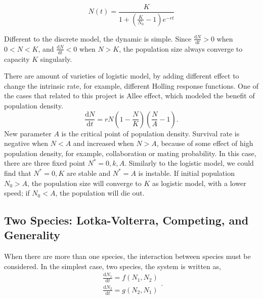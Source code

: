     \begin{equation*}
        N(t) = \frac{K}{1 + (\frac{K}{N_0}-1) e^{-rt}}
    \end{equation*}
    
    Different to the discrete model, the dynamic is simple. Since $\frac{\mathrm{d} N}{\mathrm{d}t}>0$ when $0<N<K$, and $\frac{\mathrm{d} N}{\mathrm{d}t}<0$ when $N>K$, the population size always converge to capacity $K$ singularly.

    There are amount of varieties of logistic model, by adding different effect to change the intrinsic rate, for example, different Holling response functions. One of the cases that related to this project is Allee effect, which modeled the benefit of population density.
    \begin{equation}
        \frac{\mathrm{d} N}{\mathrm{d}t} = r N (1-\frac{N}{K}) (\frac{N}{A} - 1).
    \end{equation}
    New parameter $A$ is the critical point of population density. Survival rate is negative when $N<A$ and increased when $N>A$, because of some effect of high population density, for example, collaboration or mating probability. In this case, there are three fixed point $N^* = 0, k, A$. Similarly to the logistic model, we could find that $N^* = 0, K$ are stable and $N^*=A$ is instable. If initial population $N_0>A$, the population size will converge to $K$ as logistic model, with a lower speed; if $N_0<A$, the population will die out.

    \subsection{Two Species: Lotka-Volterra, Competing, and Generality}

    When there are more than one species, the interaction between species must be considered. In the simplest case, two species, the system is written as,
    \begin{equation}
        \begin{aligned}
            \frac{\mathrm{d} N_{1}}{\mathrm{d}t} = f(N_{1},N_{2})\\
            \frac{\mathrm{d} N_{2}}{\mathrm{d}t} = g(N_{2},N_{1})
        \end{aligned}.
    \end{equation}

